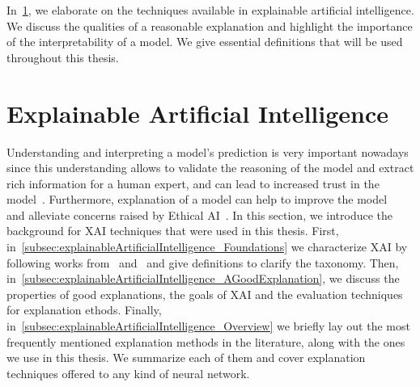 In~\ref{sec:explainableArtificialIntelligence}, we elaborate on the techniques available in explainable artificial intelligence. We discuss the qualities of a reasonable explanation and highlight the importance of the interpretability of a model. We give essential definitions that will be used throughout this thesis.

\section{Explainable Artificial Intelligence}
\label{sec:explainableArtificialIntelligence}
Understanding and interpreting a model's prediction is very important nowadays since this understanding allows to validate the reasoning of the model and extract rich information for a human expert, and can lead to increased trust in the model~\parencite{WhyShouldITrustYou_Riberio}. Furthermore, explanation of a model can help to improve the model~\parencite{AUnifiedApproach_Lundberg} and alleviate concerns raised by Ethical AI~\parencite{MachineBias_Angwin, EURegulationsOnDecisionMaking_Goodman}.
In this section, we introduce the background for XAI techniques that were used in this thesis. First, in~\ref{subsec:explainableArtificialIntelligence_Foundations} we characterize XAI by following works from~\cite{TheMythosOfModelInterpretability_Lipton} and~\cite{XAIConceptsTaxonomies_Arrieta} and give definitions to clarify the taxonomy. Then, in~\ref{subsec:explainableArtificialIntelligence_AGoodExplanation}, we discuss the properties of good explanations, the goals of XAI and the evaluation techniques for explanation ethods. Finally, in~\ref{subsec:explainableArtificialIntelligence_Overview} we briefly lay out the most frequently mentioned explanation methods in the literature, along with the ones we use in this thesis. We summarize each of them and cover explanation techniques offered to any kind of neural network.

